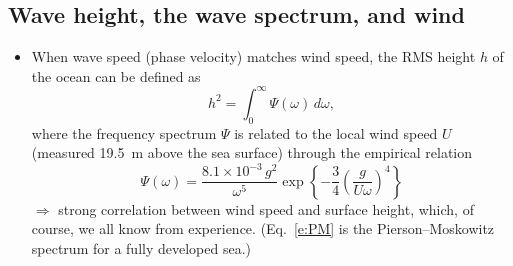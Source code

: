 \documentclass[11pt, oneside]{article}
\begin{document}
\subsection{Wave height, the wave spectrum, and wind}

\begin{itemize}
	\item When wave speed (phase velocity) matches wind speed, the RMS height $h$ of the ocean can be defined as
	\begin{equation}
		\label{e:h2}
		h^2 = \int_0^\infty \Psi(\omega)\,d\omega,
	\end{equation}
	where the frequency spectrum $\Psi$ is related to the local wind speed $U$ (measured 19.5~m above the sea surface) through the empirical relation
	\begin{equation}
		\label{e:PM}
		\Psi(\omega) = \frac{8.1\times10^{-3}\,g^2}{\omega^5}\exp\left\{-\frac{3}{4}\left(\frac{g}{U\omega}\right)^4\right\}
	\end{equation}
	$\Rightarrow$ strong correlation between wind speed and surface height, which, of course, we all know from experience.
	(Eq.~\ref{e:PM} is the Pierson--Moskowitz spectrum for a fully developed sea.)

\end{itemize}
\end{document}
